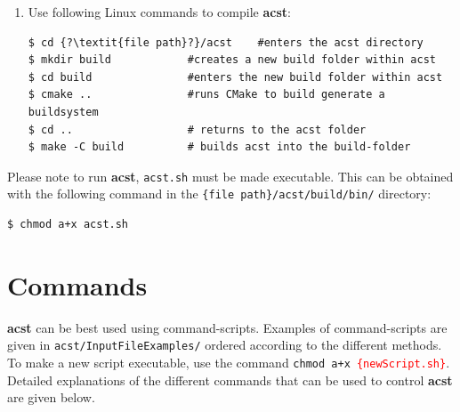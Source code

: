 \begin{enumerate}
\begin{lstlisting}[basicstyle=\ttfamily\scriptsize,backgroundcolor={\color{gray!30}}, escapechar=?]
#!/bin/bash

export LD_LIBRARY_PATH="?\textcolor{red}{\{file path to acst\}}?:${LD_LIBRARY_PATH}"
export OA_UNSUPPORTED_PLAT=linux_rhel40
${CMAKE_RUNTIME_OUTPUT_DIRECTORY}/acst $@	
\end{lstlisting}

An example of an adequate {\tt acst.sh} file is given below:

\begin{lstlisting}[basicstyle=\ttfamily\scriptsize,backgroundcolor={\color{gray!30}}, escapechar=?]
#!/bin/bash
	
export LD_LIBRARY_PATH="usr/local/public/include/gecode-release-6.2.0:${LD_LIBRARY
_PATH}"
export OA_UNSUPPORTED_PLAT=linux_rhel40
${CMAKE_RUNTIME_OUTPUT_DIRECTORY}/acst $@
\end{lstlisting}

\item Use following Linux commands to compile {\bf acst}:

\begin{lstlisting}[basicstyle=\ttfamily\scriptsize,backgroundcolor={\color{gray!30}}, escapechar=? ]
$ cd {?\textit{file path}?}/acst    #enters the acst directory
$ mkdir build            #creates a new build folder within acst
$ cd build               #enters the new build folder within acst
$ cmake ..               #runs CMake to build generate a buildsystem
$ cd ..                  # returns to the acst folder
$ make -C build          # builds acst into the build-folder
\end{lstlisting}
\end{enumerate}

Please note to run {\bf acst}, {\tt acst.sh} must be made executable. This can be obtained with the following command in the {\tt \{file path\}/acst/build/bin/} directory:
\begin{lstlisting}[basicstyle=\ttfamily\scriptsize,backgroundcolor={\color{gray!30}}, escapechar=? ]
$ chmod a+x acst.sh
\end{lstlisting}


\chapter{Commands}\label{ch:Commands}
{\bf acst} can be best used using command-scripts. Examples of  command-scripts are given in {\tt acst/InputFileExamples/} ordered according to the different methods. To make a new script executable, use the command {\tt chmod a+x \textcolor{red}{\{newScript.sh\}}}.
Detailed explanations of the different commands that can be used to control {\bf acst} are given below.

